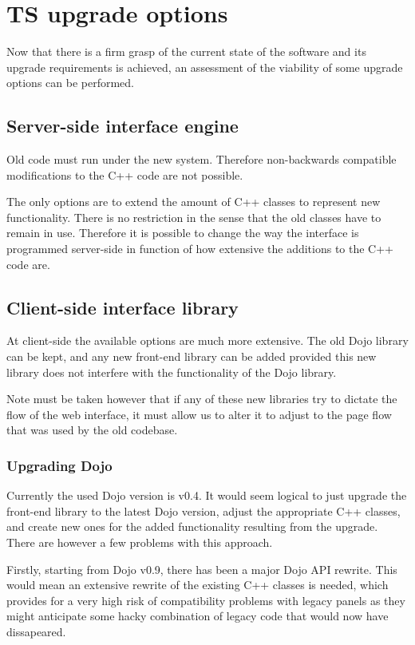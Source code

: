 \chapter{TS upgrade options}
Now that there is a firm grasp of the current state of the software and its
upgrade requirements is achieved, an assessment of the viability of some upgrade options can be performed.

\section{Server-side interface engine}
Old code must run under the new system. Therefore non-backwards
compatible modifications to the C++ code are not possible.

The only options are to extend the amount of C++ classes to represent new
functionality.
There is no restriction in the sense that the old classes have to remain in use.
Therefore it is possible to change the way the interface is programmed
server-side in function of how extensive the additions to the C++ code are.

\section{Client-side interface library}
At client-side the available options are much more extensive.
The old Dojo library can be kept, and any new front-end library can be
added provided this new library does not interfere with the functionality of the
Dojo library.

Note must be taken however that if any of these new libraries try to dictate the
flow of the web interface, it must allow us to alter it to adjust to the page
flow that was used by the old codebase.

\subsection{Upgrading Dojo}
Currently the used Dojo version is v0.4. It would seem logical to just upgrade
the front-end library to the latest Dojo version, adjust the appropriate C++
classes, and create new ones for the added functionality resulting from the upgrade.
There are however a few problems with this approach.

Firstly, starting from Dojo v0.9, there has been a major Dojo API rewrite.
This would mean an extensive rewrite of the existing C++ classes is needed, which
provides for a very high risk of compatibility problems with legacy panels as
they might anticipate some hacky combination of legacy code that would now have
dissapeared.

